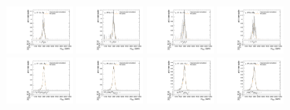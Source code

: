 \begin{figure}[htpb]
  \centering
  \includegraphics[width=0.2\textwidth]{fig/2Dfit/templateVsReco_ZprToWW2000_r0_MVV_mu_HP_bb_LDy_linear.pdf}
  \includegraphics[width=0.2\textwidth]{fig/2Dfit/templateVsReco_ZprToWW2000_r0_MVV_mu_LP_bb_LDy_linear.pdf}
  \includegraphics[width=0.2\textwidth]{fig/2Dfit/templateVsReco_ZprToWW2000_r0_MVV_mu_HP_bb_HDy_linear.pdf}
  \includegraphics[width=0.2\textwidth]{fig/2Dfit/templateVsReco_ZprToWW2000_r0_MVV_mu_LP_bb_HDy_linear.pdf}\\
  \includegraphics[width=0.2\textwidth]{fig/2Dfit/templateVsReco_ZprToWW2000_r0_MVV_mu_HP_nobb_LDy_linear.pdf}
  \includegraphics[width=0.2\textwidth]{fig/2Dfit/templateVsReco_ZprToWW2000_r0_MVV_mu_LP_nobb_LDy_linear.pdf}
  \includegraphics[width=0.2\textwidth]{fig/2Dfit/templateVsReco_ZprToWW2000_r0_MVV_mu_HP_nobb_HDy_linear.pdf}
  \includegraphics[width=0.2\textwidth]{fig/2Dfit/templateVsReco_ZprToWW2000_r0_MVV_mu_LP_nobb_HDy_linear.pdf}\\

\end{figure}
